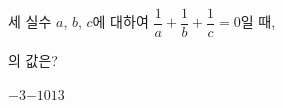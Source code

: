세 실수 $a$, $b$, $c$에 대하여 $\dfrac{1}{a}+\dfrac{1}{b}+\dfrac{1}{c}=0$일 때, \par\smallskip{}\par\smallskip\noindent 의 값은?
\begin{choices32}{$-3$}{$-1$}{$0$}{$1$}{$3$}\end{choices32}
